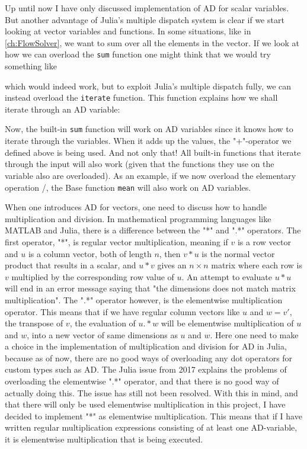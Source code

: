 Up until now I have only discussed implementation of AD for scalar variables. But another advantage of Julia's multiple dispatch system is clear if we start looking at vector variables and functions. In some situations, like in \autoref{ch:FlowSolver}, we want to sum over all the elements in the vector. If we look at how we can overload the \texttt{sum} function one might think that we would try something like

which would indeed work, but to exploit Julia's multiple dispatch fully, we can instead overload the \texttt{iterate} function. This function explains how we shall iterate through an AD variable: 

Now, the built-in \texttt{sum} function will work on AD variables since it knows how to iterate through the variables. When it adds up the values, the "+"-operator we defined above is being used. And not only that! All built-in functions that iterate through the input will also work (given that the functions they use on the variable also are overloaded). As an example, if we now overload the elementary operation /, the Base function \texttt{mean} will also work on AD variables.

When one introduces AD for vectors, one need to discuss how to handle multiplication and division. In mathematical programming languages like MATLAB and Julia, there is a difference between the "*" and ".*" operators. The first operator, "*", is regular vector multiplication, meaning if $v$ is a row vector and $u$ is a column vector, both of length $n$, then $v*u$ is the normal vector product that results in a scalar, and $u*v$ gives an $n\times n$ matrix where each row is $v$ multiplied by the corresponding row value of $u$. An attempt to evaluate $u*u$ will end in an error message saying that "the dimensions does not match matrix multiplication". The ".*" operator however, is the elementwise multiplication operator. This means that if we have regular column vectors like $u$ and $w = v'$, the transpose of $v$, the evaluation of $u.*w$ will be elementwise multiplication of $u$ and $w$, into a new vector of same dimensions as $u$ and $w$. Here one need to make a choice in the implementation of multiplication and division for AD in Julia, because as of now, there are no good ways of overloading any dot operators for custom types such as AD. The Julia issue \emph{\cite{JuliaIssueDot}} from 2017 explains the problems of overloading the elementwise ".*" operator, and that there is no good way of actually doing this. The issue has still not been resolved. With this in mind, and that there will only be used elementwise multiplication in this project, I have decided to implement "*" as elementwise multiplication. This means that if I have written regular multiplication expressions consisting of at least one AD-variable, it is elementwise multiplication that is being executed.

